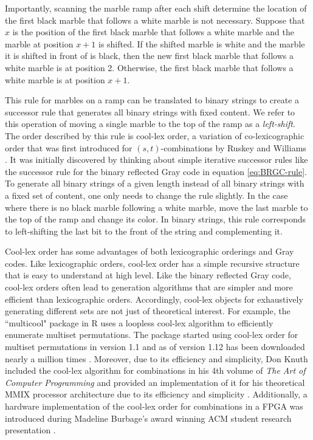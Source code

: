 Importantly, scanning the marble ramp after each shift determine the location of the first black marble that follows a white marble is not necessary.  
Suppose that $x$ is the position of the first black marble that follows a white marble and the marble at position $x+1$ is shifted.  If the shifted marble is white and the marble it is shifted in front of is black, then the new first black marble that follows a white marble is at position 2.  Otherwise, the first black marble that follows a white marble is at position $x+1$.  

This rule for marbles on a ramp can be translated to binary strings to create a successor rule that generates all binary strings with fixed content.  We refer to this operation of moving a single marble to the top of the ramp as a \emph{left-shift}.
The order described by this rule is 
cool-lex order, a variation of co-lexicographic order that was first introduced for $(s,t)$-combinations by Ruskey and Williams \cite{ruskey2005generating,ruskey2009generating}.  It was initially discovered by thinking about simple iterative successor rules like the successor rule for the binary reflected Gray code in equation \eqref{eq:BRGC-rule}. To generate all binary strings of a given length instead of all binary strings with a fixed set of content, one only needs to change the rule slightly.  In the case where there is no black marble following a white marble, move the last marble to the top of the ramp and change its color.  In binary strings, this rule corresponds to left-shifting the last bit to the front of the string and complementing it.

Cool-lex order has some advantages of both lexicographic orderings and Gray codes.  Like lexicographic orders, cool-lex order has a simple recursive structure that is easy to understand at  high level.  
Like the binary reflected Gray code, cool-lex orders often lead to generation algorithms that are simpler and more efficient than lexicographic orders.  Accordingly, cool-lex objects for exhaustively generating different sets are not just of theoretical interest.
For example, the ``multicool" package in R uses a loopless cool-lex algorithm to efficiently enumerate multiset permutations.   The package started using cool-lex order for multiset permutations in version 1.1 and as of version 1.12 has been downloaded nearly a million times \cite{multicool_2021}.  Moreover, due to its efficiency and simplicity, Don Knuth included the cool-lex algorithm for combinations in his 4th volume of \emph{The Art of Computer Programming} and provided an implementation of it for his theoretical MMIX processor architecture due to its efficiency and simplicity \cite{knuth2015art}.  Additionally, a hardware implementation of the cool-lex order for combinations in a FPGA was introduced during Madeline Burbage's award winning ACM student research presentation \cite{burbage2020cool}.

